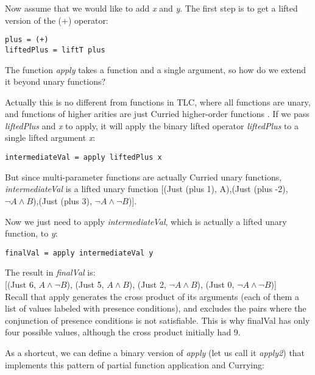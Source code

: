 \documentclass[10pt,conference]{IEEEtran}
\begin{document}
\begin{exmp}

Now assume that we would like to add \emph{x} and \emph{y}. The first step is to get a lifted version of the (+) operator:

\begin{verbatim}
plus = (+)
liftedPlus = liftT plus
\end{verbatim}

The function \emph{apply} takes a function and a single argument, so how do we extend it beyond unary functions?

Actually this is no different from functions in TLC, where all functions are unary, and functions of higher arities are just Curried higher-order functions \cite{Pierce2002}. If we pass \emph{liftedPlus} and \emph{x} to apply, it will apply the binary lifted operator \emph{liftedPlus} to a single lifted argument \emph{x}:

\begin{verbatim}
intermediateVal = apply liftedPlus x
\end{verbatim}

But since multi-parameter functions are actually Curried unary functions, \emph{intermediateVal} is a lifted unary function [(Just (plus 1), A),(Just (plus -2), $\neg A \wedge B$),(Just (plus 3), $\neg A \wedge \neg B$)].

Now we just need to apply \emph{intermediateVal}, which is actually a lifted unary function, to \emph{y}:

\begin{verbatim}
finalVal = apply intermediateVal y
\end{verbatim}

The result in \emph{finalVal} is: \\

[(Just 6, $A \wedge \neg B$), (Just 5, $A \wedge B$), (Just 2, $\neg A \wedge B$), (Just 0, $\neg A \wedge \neg B$)] \\

Recall that apply generates the cross product of its arguments (each of them a list of values labeled with presence conditions), and excludes the pairs where the conjunction of presence conditions is not satisfiable. This is why finalVal has only four possible values, although the cross product initially had 9.

As a shortcut, we can define a binary version of \emph{apply} (let us call it \emph{apply2}) that implements this pattern of partial function application and Currying:


\end{exmp}
\end{document}
